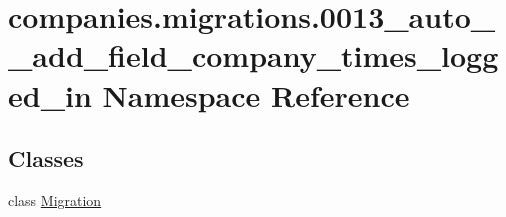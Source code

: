 \hypertarget{namespacecompanies_1_1migrations_1_10013__auto____add__field__company__times__logged__in}{\section{companies.\-migrations.0013\-\_\-auto\-\_\-\-\_\-add\-\_\-field\-\_\-company\-\_\-times\-\_\-logged\-\_\-in Namespace Reference}
\label{namespacecompanies_1_1migrations_1_10013__auto____add__field__company__times__logged__in}
}
\subsection*{Classes}
\begin{DoxyCompactItemize}
\item 
class \hyperlink{classcompanies_1_1migrations_1_10013__auto____add__field__company__times__logged__in_1_1_migration}{Migration}
\end{DoxyCompactItemize}
